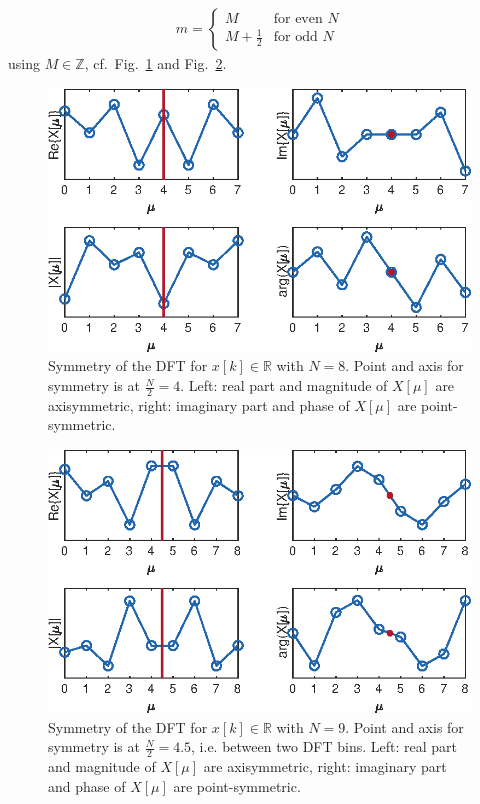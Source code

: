 \documentclass[11pt,a4paper,DIV=12]{scrartcl}
\begin{document}
\begin{align}
m=\begin{cases}M&\text{for even }N\\
M+\frac{1}{2}&\text{for odd }N\end{cases}
\end{align}
%
using $M\in\mathbb{Z}$, cf.~Fig.~\ref{Symmetry_DFT_N8} and Fig.~\ref{Symmetry_DFT_N9}.
%
\begin{figure}
		\centering
		\includegraphics[]{graphics/Symmetry_DFT_N8}
		\caption{Symmetry of the DFT for $x[k]\in\mathbb{R}$ with $N=8$.
		Point and axis for symmetry is at $\frac{N}{2}=4$.
		Left: real part and magnitude of $X[\mu]$ are axisymmetric,
		right: imaginary part and phase of $X[\mu]$ are point-symmetric.}
		\label{Symmetry_DFT_N8}
\end{figure}
\begin{figure}
		\centering
		\includegraphics[]{graphics/Symmetry_DFT_N9}
		\caption{Symmetry of the DFT for $x[k]\in\mathbb{R}$ with $N=9$.
		Point and axis for symmetry is at $\frac{N}{2}=4.5$, i.e. between two DFT bins.
		Left: real part and magnitude of $X[\mu]$ are axisymmetric,
		right: imaginary part and phase of $X[\mu]$ are point-symmetric.}
		\label{Symmetry_DFT_N9}
\end{figure}
\end{document}
